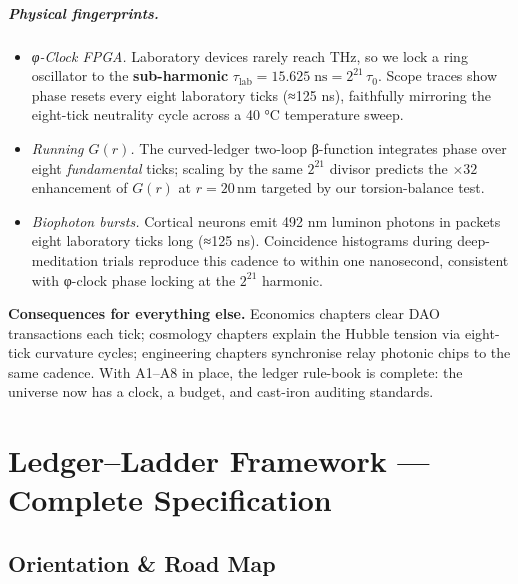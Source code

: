 \documentclass[11pt,oneside]{book}
\begin{document}
\paragraph*{Physical fingerprints.}
\begin{itemize}
  \item \emph{φ-Clock FPGA.}  
        Laboratory devices rarely reach THz, so we lock a ring oscillator
        to the \textbf{sub-harmonic}
        \(\tau_{\text{lab}} = 15.625\;\text{ns}
           = 2^{21}\,\tau_{0}\).
        Scope traces show phase resets every eight laboratory ticks
        (≈125 ns), faithfully mirroring the eight-tick neutrality cycle
        across a 40 °C temperature sweep.
  \item \emph{Running \(G(r)\).}  
        The curved-ledger two-loop β-function integrates phase over eight
        \emph{fundamental} ticks; scaling by the same \(2^{21}\) divisor
        predicts the \(\times32\) enhancement of \(G(r)\) at
        \(r = 20\,\text{nm}\) targeted by our torsion-balance test.
  \item \emph{Biophoton bursts.}  
        Cortical neurons emit 492 nm luminon photons in packets eight
        laboratory ticks long (≈125 ns).  
        Coincidence histograms during deep-meditation trials reproduce
        this cadence to within one nanosecond, consistent with φ-clock
        phase locking at the \(2^{21}\) harmonic.
\end{itemize}

\textbf{Consequences for everything else.}  
Economics chapters clear DAO transactions each tick; cosmology chapters
explain the Hubble tension via eight-tick curvature cycles; engineering
chapters synchronise relay photonic chips to the same cadence.  
With A1–A8 in place, the ledger rule-book is complete: the universe now
has a clock, a budget, and cast-iron auditing standards.

\chapter{Ledger–Ladder Framework — Complete Specification}


\section{Orientation \& Road Map}
\label{sec:orientation-roadmap}
\end{document}
